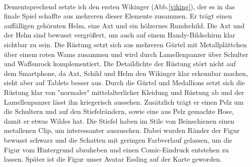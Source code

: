 \documentclass[extern,palatino]{cgBA}
\begin{document}
\\Dementsprechend setzte ich den ersten Wikinger (Abb.\ref{viking}), der es in das finale Spiel schaffte aus mehreren dieser Elemente zusammen. Er trägt einen auffälligen gehörnten Helm, eine Axt und ein hölzernes Rundschild. Die Axt und der Helm sind bewusst vergrößert, um auch auf einem Handy-Bildschirm klar sichtbar zu sein. Die Rüstung setzt sich aus mehreren Gürtel mit Metallplättchen über einem roten Wams zusammen und wird durch Lamellenpanzer über Schulter und Waffenrock komplementiert. Die Detaildichte der Rüstung stört nicht auf dem Smartphone, da Axt, Schild und Helm den Wikinger klar erkennbar machen, sieht aber auf Tablets besser aus. Durch die Gürtel und Medallions setzt sich die Rüstung klar von "normaler" mittelalterlicher Kleidung und Rüstung ab und der Lamellenpanzer lässt ihn kriegerisch aussehen. Zusätzlich trägt er einen Pelz um die Schultern und auf den Stiefelrändern, sowie eine aus Pelz gemachte Hose, damit er etwas Wildes hat. Die Stiefel haben im Stile von Beinschienen einen metallenen Clip, um interessanter auszusehen. Dabei wurden Ränder der Figur bewusst schwarz und die Schatten mit geringen Farbverlauf gelassen, um die Figur vom Hintergrund abzuheben und einen Comic-Eindruck entstehen zu lassen. Später ist die Figur unser Avatar Essling auf der Karte geworden.
	
\newpage
\end{document}
